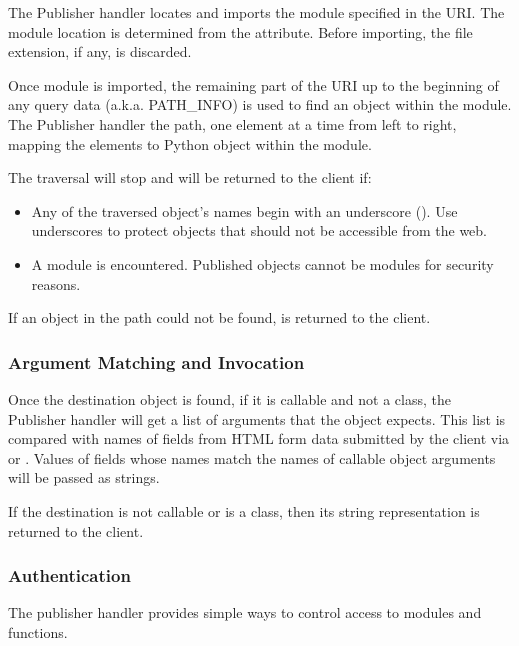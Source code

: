 The Publisher handler locates and imports the module specified in the
URI. The module location is determined from the
 attribute. Before importing, the file extension, 
if any, is discarded.

Once module is imported, the remaining part of the URI up to the
beginning of any query data (a.k.a. PATH_INFO) is used to find an
object within the module. The Publisher handler  the 
path, one element at a time from left to right, mapping the elements
to Python object within the module.

The traversal will stop and  will be returned to
the client if:

\begin{itemize}

\item
Any of the traversed object's names begin with an underscore
(\samp{\_}). Use underscores to protect objects that should not be
accessible from the web.

\item
A module is encountered. Published objects cannot be modules for
security reasons.

\end{itemize}

If an object in the path could not be found, 
is returned to the client.

\subsubsection{Argument Matching and Invocation\label{hand-pub-alg-args}}

Once the destination object is found, if it is callable and not a
class, the Publisher handler will get a list of arguments that the
object expects. This list is compared with names of fields from HTML
form data submitted by the client via  or
. Values of fields whose names match the names of callable
object arguments will be passed as strings.

If the destination is not callable or is a class, then its string
representation is returned to the client.

\subsubsection{Authentication\label{hand-pub-alg-auth}}

The publisher handler provides simple ways to control access to
modules and functions.

